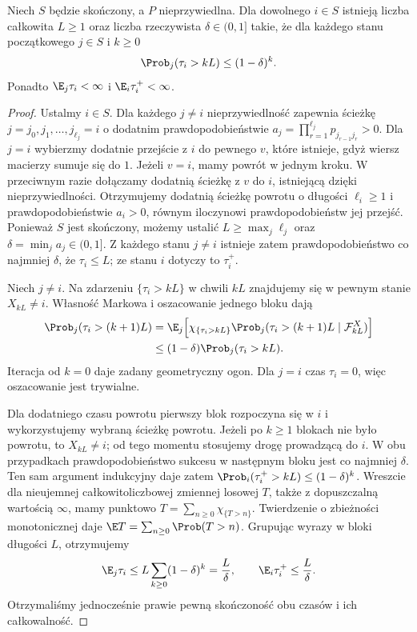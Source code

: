 \begin{lemat}
Niech $S$ będzie skończony, a $P$ nieprzywiedlna.
Dla dowolnego $i\in S$ istnieją liczba całkowita
$L\geq1$ oraz liczba rzeczywista $\delta\in(0,1]$
takie, że dla każdego
stanu początkowego $j\in S$ i $k\geq0$
\[
\Prob_j(\tau_i>kL)\leq(1-\delta)^k.
\]
Ponadto $\E_j\tau_i<\infty$ i
$\E_i\tau_i^+<\infty$.
\end{lemat}
\begin{proof}
Ustalmy $i\in S$. Dla każdego $j\neq i$
nieprzywiedlność zapewnia ścieżkę
$j=j_0,j_1,\ldots,j_{\ell_j}=i$ o dodatnim
prawdopodobieństwie
$a_j=\prod_{r=1}^{\ell_j}p_{j_{r-1}j_r}>0$.
Dla $j=i$ wybierzmy dodatnie przejście
z $i$ do pewnego $v$, które istnieje, gdyż
wiersz macierzy sumuje się do $1$. Jeżeli $v=i$,
mamy powrót w jednym kroku. W przeciwnym razie
dołączamy dodatnią ścieżkę z $v$ do $i$,
istniejącą dzięki nieprzywiedlności. Otrzymujemy
dodatnią ścieżkę powrotu o długości
$\ell_i\geq1$ i prawdopodobieństwie $a_i>0$,
równym iloczynowi prawdopodobieństw jej przejść.
Ponieważ $S$ jest skończony, możemy ustalić
$L\geq\max_j\ell_j$ oraz
$\delta=\min_j a_j\in(0,1]$.
Z każdego stanu $j\neq i$ istnieje zatem
prawdopodobieństwo co najmniej $\delta$, że
$\tau_i\leq L$; ze stanu $i$ dotyczy to
$\tau_i^+$.

Niech $j\neq i$. Na zdarzeniu $\{\tau_i>kL\}$
w chwili $kL$ znajdujemy się w pewnym stanie
$X_{kL}\neq i$. Własność Markowa i oszacowanie
jednego bloku dają
\begin{align*}
\Prob_j(\tau_i>(k+1)L)
&=\E_j\Bigl[\chi_{\{\tau_i>kL\}}
  \Prob_j(\tau_i>(k+1)L\mid\mathcal F_{kL}^X)\Bigr]\\
&\leq(1-\delta)\Prob_j(\tau_i>kL).
\end{align*}
Iteracja od $k=0$ daje zadany geometryczny ogon.
Dla $j=i$ czas $\tau_i=0$, więc oszacowanie
jest trywialne.

Dla dodatniego czasu powrotu pierwszy blok
rozpoczyna się w $i$ i wykorzystujemy wybraną
ścieżkę powrotu. Jeżeli po $k\geq1$ blokach
nie było powrotu, to $X_{kL}\neq i$; od tego
momentu stosujemy drogę prowadzącą do $i$.
W obu przypadkach prawdopodobieństwo sukcesu
w następnym bloku jest co najmniej $\delta$.
Ten sam argument indukcyjny daje zatem
$\Prob_i(\tau_i^+>kL)\leq(1-\delta)^k$.
Wreszcie dla nieujemnej całkowitoliczbowej zmiennej
losowej $T$, także z dopuszczalną wartością
$\infty$, mamy punktowo
$T=\sum_{n\geq0}\chi_{\{T>n\}}$.
Twierdzenie o zbieżności monotonicznej daje
$\E T=\sum_{n\geq0}\Prob(T>n)$.
Grupując wyrazy w bloki długości $L$, otrzymujemy
\[
\E_j\tau_i\leq L\sum_{k\geq0}(1-\delta)^k
=\frac L\delta,
\qquad
\E_i\tau_i^+\leq\frac L\delta.
\]
Otrzymaliśmy jednocześnie prawie pewną skończoność
obu czasów i ich całkowalność.
\end{proof}

